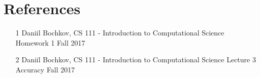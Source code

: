 \documentclass[12pt]{article}
\begin{document}


\newpage
\clearpage
\setcounter{page}{1} \pagestyle{empty}
\section{References}\label{sec::References}
\begin{itemize}
\item [1] Daniil Bochkov, CS 111 - Introduction to Computational Science Homework 1 Fall 2017
\item [2] Daniil Bochkov, CS 111 - Introduction to Computational Science Lecture 3 Accuracy Fall 2017

\end{itemize}


\end{document}
